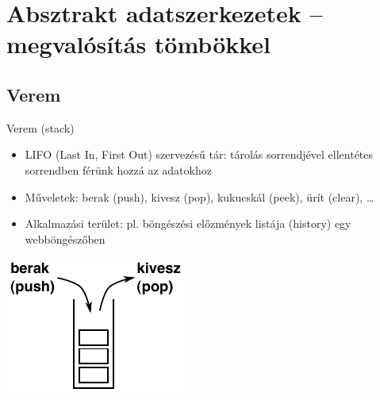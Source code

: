 \documentclass[usenames,dvipsnames,aspectratio=169]{beamer}
\begin{document}
\section{Absztrakt adatszerkezetek -- megvalósítás tömbökkel}
\subsection{Verem}
\begin{frame}
  Verem (stack)
  \begin{itemize}
    \item LIFO (Last In, First Out) szervezésű tár: tárolás sorrendjével ellentétes sorrendben férünk hozzá az adatokhoz
    \item Műveletek: berak (push), kivesz (pop), kukucskál (peek), ürít (clear), \dots
    \item Alkalmazási terület: pl. böngészési előzmények listája (history) egy webböngészőben
  \end{itemize}
  \begin{center}
    \includegraphics{verem.pdf}
  \end{center}
\end{frame}

\begin{frame}
  \begin{exampleblock}{}
    \vspace{-.2cm}
    
    \vspace{-.2cm}
  \end{exampleblock}
\end{frame}

\begin{frame}
  \scriptsize
  \begin{exampleblock}{}
    \vspace{-.2cm}
    
    \vspace{-.2cm}
  \end{exampleblock}
\end{frame}
\end{document}
